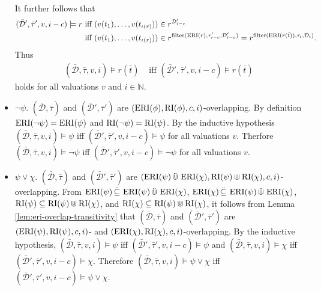\begin{itemize}
\begin{align*}
        \end{align*}
        It further follows that 
        \begin{align*}
            (\bar{\mathcal{D}}', \bar{\tau}', v, i-c) \models r
            &\text{ iff }
            (v(t_1), \dots, v(t_{\iota(r)})) \in r^{\mathcal{D}'_{i-c}} \\
            &\text{ iff }
            (v(t_1), \dots, v(t_{\iota(r)})) \in r^{\operatorname{filter}(\operatorname{ERI}(r), \tau'_{i-c}, \mathcal{D}'_{i-c})} = r^{\operatorname{filter}(\operatorname{ERI}(r(\bar{t})), \tau_i, \mathcal{D}_i)}.
        \end{align*}
        Thus
        \begin{align*}
            (\bar{\mathcal{D}}, \bar{\tau}, v, i) \models r(\bar{t})
            &\text{ iff }
            (\bar{\mathcal{D}}', \bar{\tau}', v, i-c) \models r(\bar{t})
        \end{align*}
        holds for all valuations $v$ and $i \in \mathbb{N}$.

    \item 
        $\neg \psi$. 
        $(\bar{\mathcal{D}}, \bar{\tau})$ and $(\bar{\mathcal{D}}', \bar{\tau}')$ are $(\operatorname{ERI}(\phi), \operatorname{RI}(\phi), c, i)$-overlapping.
        By definition $\operatorname{ERI}(\neg \psi) = \operatorname{ERI}(\psi)$ and $\operatorname{RI}(\neg \psi) = \operatorname{RI}(\psi)$.
        By the inductive hypothesis $(\bar{\mathcal{D}}, \bar{\tau}, v, i) \models \psi$ iff $(\bar{\mathcal{D}}', \bar{\tau}', v, i-c) \models \psi$ for all valuations $v$.
        Therfore $(\bar{\mathcal{D}}, \bar{\tau}, v, i) \models \neg \psi$ iff $(\bar{\mathcal{D}}', \bar{\tau}', v, i-c) \models \neg \psi$ for all valuations $v$.

    \item 
        $\psi \lor \chi$.
        $(\bar{\mathcal{D}}, \bar{\tau})$ and $(\bar{\mathcal{D}}', \bar{\tau}')$ are $(\operatorname{ERI}(\psi) \,\ddot{\Cup}\, \operatorname{ERI}(\chi), \operatorname{RI}(\psi) \Cup \operatorname{RI}(\chi), c, i)$-overlapping.
        From $\operatorname{ERI}(\psi) \,\ddot{\subseteq}\, \operatorname{ERI}(\psi) \,\ddot{\Cup}\, \operatorname{ERI}(\chi)$, $\operatorname{ERI}(\chi) \,\ddot{\subseteq}\, \operatorname{ERI}(\psi) \,\ddot{\Cup}\, \operatorname{ERI}(\chi)$, $\operatorname{RI}(\psi) \subseteq \operatorname{RI}(\psi) \Cup \operatorname{RI}(\chi)$, and $\operatorname{RI}(\chi) \subseteq \operatorname{RI}(\psi) \Cup \operatorname{RI}(\chi)$,
            it follows from Lemma \ref{lem:eri-overlap-transitivity} that $(\bar{\mathcal{D}}, \bar{\tau})$ and $(\bar{\mathcal{D}}', \bar{\tau}')$ are $(\operatorname{ERI}(\psi), \operatorname{RI}(\psi), c, i)$- and $(\operatorname{ERI}(\chi), \operatorname{RI}(\chi), c, i)$-overlapping.
        By the inductive hypothesis, $(\bar{\mathcal{D}}, \bar{\tau}, v, i) \models \psi$ iff $(\bar{\mathcal{D}}', \bar{\tau}', v, i-c) \models \psi$ and $(\bar{\mathcal{D}}, \bar{\tau}, v, i) \models \chi$ iff $(\bar{\mathcal{D}}', \bar{\tau}', v, i-c) \models \chi$.
        Therefore $(\bar{\mathcal{D}}, \bar{\tau}, v, i) \models \psi \lor \chi$ iff $(\bar{\mathcal{D}}', \bar{\tau}', v, i-c) \models \psi \lor \chi$.
        

\end{itemize}
